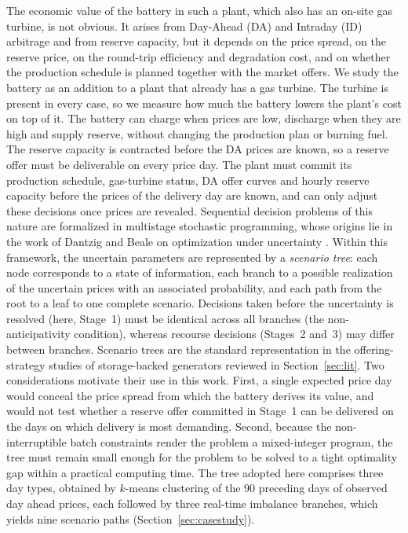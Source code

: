 \documentclass[5p,times,twocolumn]{elsarticle}
\begin{document}
The economic value of the battery in such a plant, which also has an on-site gas turbine, is not obvious. It arises from Day-Ahead (DA) and Intraday (ID) arbitrage and from reserve capacity, but it depends on the price spread, on the reserve price, on the round-trip efficiency and degradation cost, and on whether the production schedule is planned together with the market offers. We study the battery as an addition to a plant that already has a gas turbine. The turbine is present in every case, so we measure how much the battery lowers the plant's cost on top of it. The battery can charge when prices are low, discharge when they are high and supply reserve, without changing the production plan or burning fuel. The reserve capacity is contracted before the DA prices are known, so a reserve offer must be deliverable on every price day. 
The plant must commit its production schedule, gas-turbine status, DA offer curves and hourly reserve capacity before the prices of the delivery day are known, and can only adjust these decisions once prices are revealed. Sequential decision problems of this nature are formalized in multistage stochastic programming, whose origins lie in the work of Dantzig and Beale on optimization under uncertainty \cite{Birge2011}. Within this framework, the uncertain parameters are represented by a \emph{scenario tree}: each node corresponds to a state of information, each branch to a possible realization of the uncertain prices with an associated probability, and each path from the root to a leaf to one complete scenario. Decisions taken before the uncertainty is resolved (here, Stage~1) must be identical across all branches (the non-anticipativity condition), whereas recourse decisions (Stages~2 and~3) may differ between branches. Scenario trees are the standard representation in the offering-strategy studies of storage-backed generators reviewed in Section~\ref{sec:lit}. Two considerations motivate their use in this work. First, a single expected price day would conceal the price spread from which the battery derives its value, and would not test whether a reserve offer committed in Stage~1 can be delivered on the days on which delivery is most demanding. Second, because the non-interruptible batch constraints render the problem a mixed-integer program, the tree must remain small enough for the problem to be solved to a tight optimality gap within a practical computing time. The tree adopted here comprises three day types, obtained by $k$-means clustering of the 90 preceding days of observed day ahead prices, each followed by three real-time imbalance branches, which yields nine scenario paths (Section~\ref{sec:casestudy}).
\end{document}
